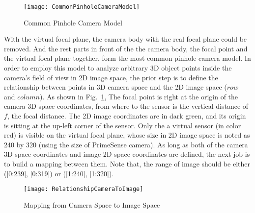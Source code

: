 \begin{figure}[t]
\centering
\texttt{[image: CommonPinholeCameraModel]}
\caption{Common Pinhole Camera Model}
\label{CommonPinholeCameraModel}
\end{figure}%
%

With the virtual focal plane, the camera body with the real focal plane could be removed. And the rest parts in front of the the camera body, the focal point and the virtual focal plane together, form the most common pinhole camera model. In order to employ this model to analyze arbitrary 3D object points inside the camera's field of view in 2D image space, the prior step is to define the relationship between points in 3D camera space and the 2D image space (\(row\) and \(column\)). As shown in Fig.~\ref{CommonPinholeCameraModel}, The focal point is right at the origin of the camera 3D space coordinates, from where to the sensor is the vertical distance of \(f\), the focal distance. The 2D image coordinates are in dark green, and its origin is sitting at the up-left corner of the sensor. Only the a virtual sensor (in color red) is visible on the virtual focal plane, whose size in 2D image space is noted as 240 by 320 (using the size of PrimeSense camera). As long as both of the camera 3D space coordinates and image 2D space coordinates are defined, the next job is to build a mapping between them. Note that, the range of image should be either ([0:239], [0:319]) or ([1:240], [1:320]).
%
\begin{figure}[b]
\centering
\texttt{[image: RelationshipCameraToImage]}
\caption{Mapping from Camera Space to Image Space}
\label{RelationshipCameraToImage}
\end{figure}%
%

